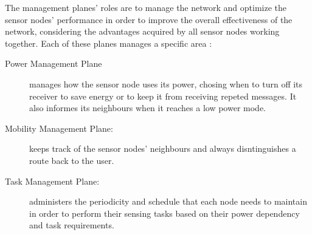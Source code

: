 The management planes' roles are to manage the network and optimize the sensor nodes'
performance in order to improve the overall effectiveness of the network, considering the
advantages acquired by all sensor nodes working together. Each of these planes manages
a specific area \cite{Akyildiz2002}:
\begin{description}
    \item[Power Management Plane] manages how the sensor node uses its power, chosing when to
        turn off its receiver to save energy or to keep it from receiving repeted messages. It
        also informes its neighbours when it reaches a low power mode.
    \item[Mobility Management Plane:] keeps track of the sensor nodes' neighbours and always
        disntinguishes a route back to the user.
    \item[Task Management Plane:] administers the periodicity and schedule that each node needs
        to maintain in order to perform their sensing tasks based on their power dependency and
        task requirements.
\end{description}

